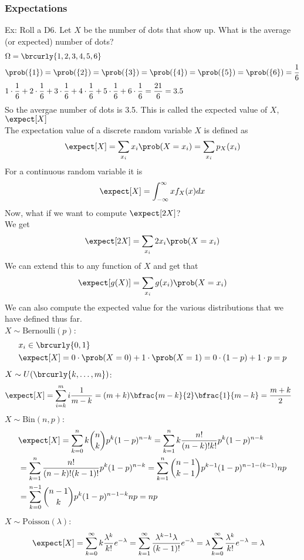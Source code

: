 \subsubsection{Expectations}
Ex: Roll a D6. Let $X$ be the number of dots that show up. What is the average (or expected) number of dots?
\begin{align*}
    &\Omega=\brcurly{1,2,3,4,5,6}\\
    &\prob(\{1\})=\prob(\{2\})=\prob(\{3\})=\prob(\{4\})=\prob(\{5\})=\prob(\{6\})=\frac{1}{6}\\
    &1\cdot\frac{1}{6}+2\cdot\frac{1}{6}+3\cdot\frac{1}{6}+4\cdot\frac{1}{6}+5\cdot\frac{1}{6}+6\cdot\frac{1}{6}=\frac{21}{6}=3.5
\end{align*}
So the avergae number of dots is 3.5. This is called the expected value of $X$, $\expect[X]$\\
The expectation value of a discrete random variable $X$ is defined as
\[\expect[X]=\sum_{x_i}x_i\prob(X=x_i)=\sum_{x_i}p_X(x_i)\]
For a continuous random variable it is
\[\expect[X]=\int_{-\infty}^\infty xf_X(x)dx\]
Now, what if we want to compute $\expect[2X]$?\\
We get
\[\expect[2X]=\sum_{x_i}2x_i\prob(X=x_i)\]
We can extend this to any function of $X$ and get that
\[\expect[g(X)]=\sum_{x_i}g(x_i)\prob(X=x_i)\]
We can also compute the expected value for the various distributions that we have defined thus far.\\
$X\sim\mathrm{Bernoulli}(p)$:
\begin{align*}
    &x_i\in\brcurly{0,1}\\
    &\expect[X]=0\cdot\prob(X=0)+1\cdot\prob(X=1)=0\cdot(1-p)+1\cdot p=p
\end{align*}
$X\sim U(\brcurly{k,\ldots,m})$:
\begin{align*}
    &\expect[X]=\sum_{i=k}^m i\frac{1}{m-k}=(m+k)\bfrac{m-k}{2}\bfrac{1}{m-k}=\frac{m+k}{2}
\end{align*}
$X\sim\mathrm{Bin}(n,p)$:
\begin{align*}
    &\expect[X]=\sum_{k=0}^n k\binom{n}{k}p^k(1-p)^{n-k}=\sum_{k=1}^nk\frac{n!}{(n-k)!k!}p^k(1-p)^{n-k}\\
    &=\sum_{k=1}^n\frac{n!}{(n-k)!(k-1)!}p^k(1-p)^{n-k}=\sum_{k=1}^n\binom{n-1}{k-1}p^{k-1}(1-p)^{n-1-(k-1)}np\\
    &=\sum_{k=0}^{n-1}\binom{n-1}{k}p^k(1-p)^{n-1-k}np=np
\end{align*}
$X\sim\mathrm{Poisson}(\lambda)$:
\begin{align*}
    &\expect[X]=\sum_{k=0}^\infty k\frac{\lambda^k}{k!}e^{-\lambda}=\sum_{k=1}^\infty\frac{\lambda^{k-1}\lambda}{(k-1)!}e^{-\lambda}=\lambda\sum_{k=0}^\infty\frac{\lambda^k}{k!}e^{-\lambda}=\lambda
\end{align*}
